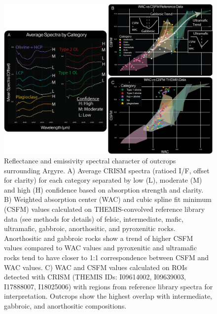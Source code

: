 \documentclass[12pt]{article}
\begin{document}
\begin{figure}
    \centering
    \includegraphics[width=\textwidth]
    {figures/03_spectra_figv3.png}
    \caption{Reflectance and emissivity spectral character of outcrops surrounding Argyre. A) Average CRISM spectra (ratioed I/F, offset for clarity) for each category separated by low (L), moderate (M) and high (H) confidence based on absorption strength and clarity. B) Weighted absorption center (WAC) and cubic spline fit minimum (CSFM) values calculated on THEMIS-convolved reference library data (see methods for details) of felsic, intermediate, mafic, ultramafic, gabbroic, anorthositic, and pyroxenitic rocks. Anorthositic and gabbroic rocks show a trend of higher CSFM values compared to WAC values and pyroxenitic and ultramafic rocks tend to have closer to 1:1 correspondence between CSFM and WAC values. C) WAC and CSFM values calculated on ROIs detected with CRISM (THEMIS IDs: I09614002, I09639003, I17888007, I18025006) with regions from reference library spectra for interpretation. Outcrops show the highest overlap with intermediate, gabbroic, and anorthositic compositions.}
    \label{fig:spectra}
\end{figure}
\end{document}
